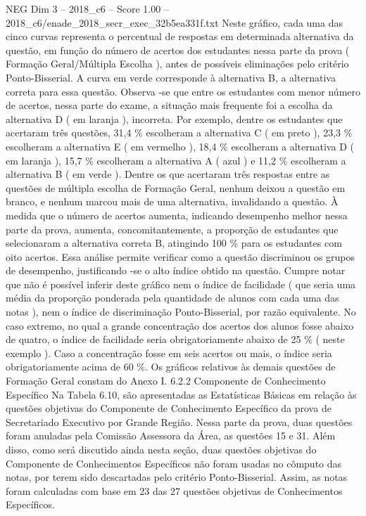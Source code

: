 \begin{textsample}{NEG Dim 3 – 2018\_c6 – Score 1.00 – 2018\_c6/enade\_2018\_secr\_exec\_32b5ea331f.txt}
Neste gráfico, cada uma das cinco curvas representa o percentual de respostas em determinada alternativa da questão, em função do número de acertos dos estudantes nessa parte da prova ( Formação Geral/Múltipla Escolha ), antes de possíveis eliminações pelo critério Ponto-Bisserial.
A curva em verde corresponde à alternativa B, a alternativa correta para essa questão.
Observa -se que entre os estudantes com menor número de acertos, nessa parte do exame, a situação mais frequente foi a escolha da alternativa D ( em laranja ), incorreta.
Por exemplo, dentre os estudantes que acertaram três questões, 31,4 \% escolheram a alternativa C ( em preto ), 23,3 \% escolheram a alternativa E ( em vermelho ), 18,4 \% escolheram a alternativa D ( em laranja ), 15,7 \% escolheram a alternativa A ( azul ) e 11,2 \% escolheram a alternativa B ( em verde ).
Dentre os que acertaram três respostas entre as questões de múltipla escolha de Formação Geral, nenhum deixou a questão em branco, e nenhum marcou mais de uma alternativa, invalidando a questão.
À medida que o número de acertos aumenta, indicando desempenho melhor nessa parte da prova, aumenta, concomitantemente, a proporção de estudantes que selecionaram a alternativa correta B, atingindo 100 \% para os estudantes com oito acertos.
Essa análise permite verificar como a questão discriminou os grupos de desempenho, justificando -se o alto índice obtido na questão.
Cumpre notar que não é possível inferir deste gráfico nem o índice de facilidade ( que seria uma média da proporção ponderada pela quantidade de alunos com cada uma das notas ), nem o índice de discriminação Ponto-Bisserial, por razão equivalente.
No caso extremo, no qual a grande concentração dos acertos dos alunos fosse abaixo de quatro, o índice de facilidade seria obrigatoriamente abaixo de 25 \% ( neste exemplo ).
Caso a concentração fosse em seis acertos ou mais, o índice seria obrigatoriamente acima de 60 \%.
Os gráficos relativos às demais questões de Formação Geral constam do Anexo I. 6.2.2 Componente de Conhecimento Específico Na Tabela 6.10, são apresentadas as Estatísticas Básicas em relação às questões objetivas do Componente de Conhecimento Específico da prova de Secretariado Executivo por Grande Região.
Nessa parte da prova, duas questões foram anuladas pela Comissão Assessora da Área, as questões 15 e 31.
Além disso, como será discutido ainda nesta seção, duas questões objetivas do Componente de Conhecimentos Específicos não foram usadas no cômputo das notas, por terem sido descartadas pelo critério Ponto-Bisserial.
Assim, as notas foram calculadas com base em 23 das 27 questões objetivas de Conhecimentos Específicos.

\end{textsample}
